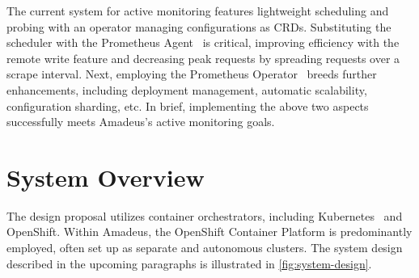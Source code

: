 The current system for active monitoring features lightweight scheduling and probing with an operator managing configurations as \ac{CRD}s. Substituting the scheduler with the Prometheus Agent~\parencite{PrometheusAgentSupport} is critical, improving efficiency with the remote write feature and decreasing peak requests by spreading requests over a scrape interval. Next, employing the Prometheus Operator~\parencite{PrometheusOperator} breeds further enhancements, including deployment management, automatic scalability, configuration sharding, etc. In brief, implementing the above two aspects successfully meets Amadeus's active monitoring goals. 

\section{System Overview}

The design proposal utilizes container orchestrators, including Kubernetes~\parencite{ProductionGradeContainerOrchestration} and OpenShift. Within Amadeus, the OpenShift Container Platform is predominantly employed, often set up as separate and autonomous clusters. The system design described in the upcoming paragraphs is illustrated in \autoref{fig:system-design}. 

